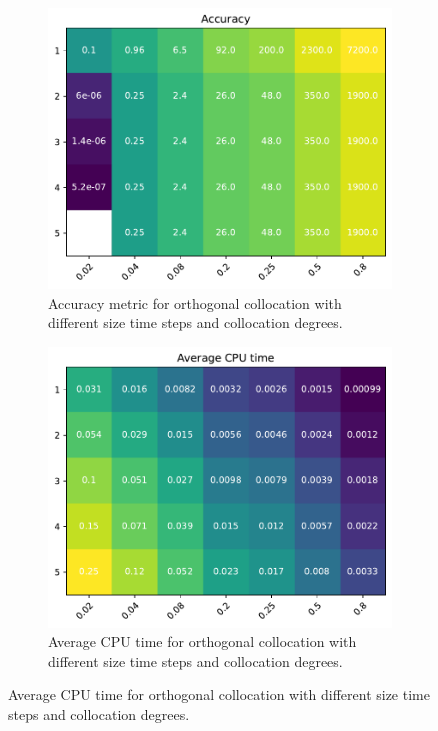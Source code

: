 \documentclass[]{article}
\begin{document}
\begin{figure}[H]
	\centering
	\begin{subfigure}[b]{0.45\textwidth}
		\centering
		\includegraphics[width=\textwidth]{figures/Accuracy.pdf}
		\caption{Accuracy metric for orthogonal collocation with different size time steps and collocation degrees.}
	\end{subfigure}%
	\hfill
	\begin{subfigure}[b]{0.45\textwidth}
		\centering
		\includegraphics[width=\textwidth]{figures/CPU.pdf}
		\caption{Average CPU time for orthogonal collocation with different size time steps and collocation degrees.}
	\end{subfigure}
	\label{fig:oc}
\end{figure}
\end{document}

